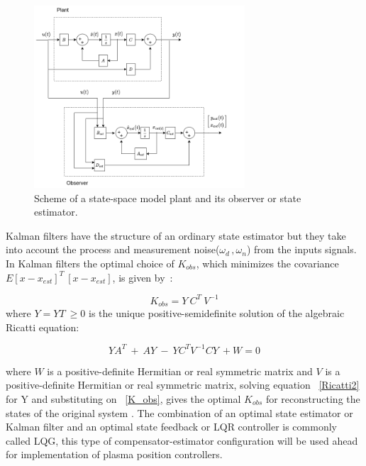 \begin{figure}[h]
	\centering
	\includegraphics[width=0.7\textwidth]{Chp2/plant_observer.png}
	\caption{ Scheme of a state-space model plant and its observer or state estimator. \label{plant_obser}}
\end{figure}

Kalman filters have the structure of an ordinary state estimator but they take into account the process and measurement noise($\omega_d\,,\omega_n$) from the inputs signals. In Kalman filters the optimal choice of $K_{obs}$, which minimizes  the covariance $E{[x-x_{est}]^T~[x-x_{est}]}$, is given by~\cite[Chapter~9]{Skogestad}:  

\begin{equation}
K_{obs}=Y~C^T~V^{-1}
\label{K_obs}
\end{equation}
 where $Y=Y{ T}~ \geq 0$ is the unique positive-semidefinite solution of the algebraic Ricatti equation:
 
 
\begin{equation}
YA^T~+~AY~-~YC^TV^{-1}CY~+W=0
\label{Ricatti2}
\end{equation}

where $W$ is a positive-definite Hermitian or real symmetric matrix and $V$ is a positive-definite Hermitian or real symmetric matrix, solving equation ~\ref{Ricatti2} for Y and substituting on ~\ref{K_obs}, gives the optimal $K_{obs}$ for reconstructing the states of the original system . The combination of an optimal state estimator or Kalman filter  and an optimal state feedback or LQR controller is commonly called LQG, this type of compensator-estimator configuration will be used ahead for implementation of plasma position controllers. 